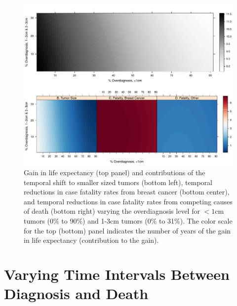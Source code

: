 \documentclass[11pt,letterpaper]{article}
\theoremstyle{plain}
\theoremstyle{remark}
\numberwithin{equation}{section}
\begin{document}
\begin{figure}[h]
\begin{center}
\includegraphics[scale=0.56]{appendix_figure2}
\caption{Gain in life expectancy (top panel) and
  contributions of the temporal shift to smaller sized tumors (bottom
  left), temporal reductions in case fatality rates from breast cancer
  (bottom center), and temporal reductions in case fatality rates from
  competing causes of death (bottom right) varying the overdiagnosis
  level for $<1$cm tumors (0\% to 90\%) and 1-3cm tumors (0\% to
  31\%).  The color scale for the top (bottom) panel indicates the
number of years of the gain in life expectancy (contribution to the gain).}
\label{fig:figure2}
\end{center}
\end{figure}

\newpage
\section{Varying Time Intervals Between Diagnosis and Death}
\end{document}
